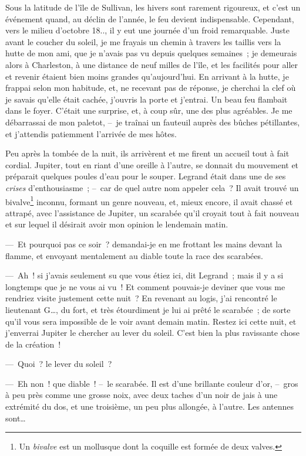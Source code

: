 \documentclass[french,twoside]{book} %
\begin{document}
Sous la latitude de l’île de Sullivan, les hivers sont rarement rigoureux, et c’est un événement quand, au déclin de l’année, le feu devient indispensable. Cependant, vers le milieu d’octobre 18.., il y eut une journée d’un froid remarquable. Juste avant le coucher du soleil, je me frayais un chemin à travers les taillis vers la hutte de mon ami, que je n’avais pas vu depuis quelques semaines ; je demeurais alors à Charleston, à une distance de neuf milles de l’île, et les facilités pour aller et revenir étaient bien moins grandes qu’aujourd’hui. En arrivant à la hutte, je frappai selon mon habitude, et, ne recevant pas de réponse, je cherchai la clef où je savais qu’elle était cachée, j’ouvris la porte et j’entrai. Un beau feu flambait dans le foyer. C’était une surprise, et, à coup sûr, une des plus agréables. Je me débarrassai de mon paletot, – je traînai un fauteuil auprès des bûches pétillantes, et j’attendis patiemment l’arrivée de mes hôtes.\par
Peu après la tombée de la nuit, ils arrivèrent et me firent un accueil tout à fait cordial. Jupiter, tout en riant d’une oreille à l’autre, se donnait du mouvement et préparait quelques poules d’eau pour le souper. Legrand était dans une de ses \emph{crises} d’enthousiasme ; – car de quel autre nom appeler cela ? Il avait trouvé un bivalve\footnote{Un \emph{bivalve} est un mollusque dont la coquille est formée de deux valves.} inconnu, formant un genre nouveau, et, mieux encore, il avait chassé et attrapé, avec l’assistance de Jupiter, un scarabée qu’il croyait tout à fait nouveau et sur lequel il désirait avoir mon opinion le lendemain matin.\par
— Et pourquoi pas ce soir ? demandai-je en me frottant les mains devant la flamme, et envoyant mentalement au diable toute la race des scarabées.\par
— Ah ! si j’avais seulement su que vous étiez ici, dit Legrand ; mais il y a si longtemps que je ne vous ai vu ! Et comment pouvais-je deviner que vous me rendriez visite justement cette nuit ? En revenant au logis, j’ai rencontré le lieutenant G…, du fort, et très étourdiment je lui ai prêté le scarabée ; de sorte qu’il vous sera impossible de le voir avant demain matin. Restez ici cette nuit, et j’enverrai Jupiter le chercher au lever du soleil. C’est bien la plus ravissante chose de la création !\par
— Quoi ? le lever du soleil ?\par
— Eh non ! que diable ! – le scarabée. Il est d’une brillante couleur d’or, – gros à peu près comme une grosse noix, avec deux taches d’un noir de jais à une extrémité du dos, et une troisième, un peu plus allongée, à l’autre. Les antennes sont…\par
\end{document}
